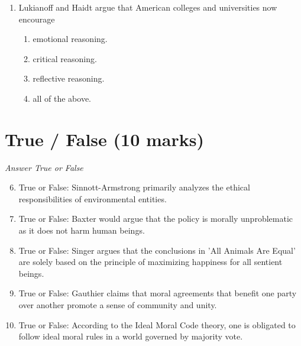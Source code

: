 \documentclass[12pt]{article}
\begin{document}
\begin{enumerate}[label=\arabic*.]
\begin{enumerate}[label=(\alph*)]
    \item Mengzi
    \item Zoroastrianism
    \item Zen Buddhism
    \item Shintoism
    \item Vedic Philosophy
\end{enumerate}
\item Lukianoff and Haidt argue that American colleges and universities now encourage
\begin{enumerate}[label=(\alph*)]
    \item emotional reasoning.
    \item critical reasoning.
    \item reflective reasoning.
    \item all of the above.
\end{enumerate}
\end{enumerate}

\section*{True / False (10 marks)}
\textit{Answer True or False}
\begin{enumerate}[label=\arabic*.]
\setcounter{enumi}{5}
\item True or False: Sinnott-Armstrong primarily analyzes the ethical responsibilities of environmental entities.
\item True or False: Baxter would argue that the policy is morally unproblematic as it does not harm human beings.
\item True or False: Singer argues that the conclusions in 'All Animals Are Equal' are solely based on the principle of maximizing happiness for all sentient beings.
\item True or False: Gauthier claims that moral agreements that benefit one party over another promote a sense of community and unity.
\item True or False: According to the Ideal Moral Code theory, one is obligated to follow ideal moral rules in a world governed by majority vote.
\end{enumerate}
\end{document}
